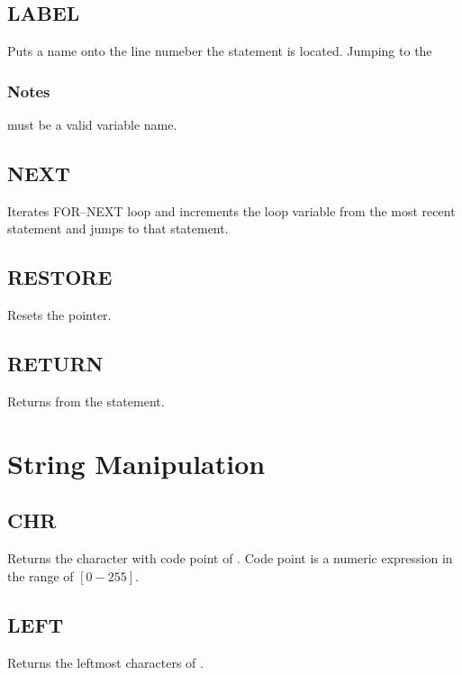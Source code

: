     \subsection{LABEL}
        \par
        Puts a name onto the line numeber the statement is located. Jumping to the 
        \subsubsection*{Notes}
        \begin{itemlist}
        \item {} must be a valid variable name.
        \end{itemlist}
    \subsection{NEXT}
        \par
        Iterates FOR--NEXT loop and increments the loop variable from the most recent  statement and jumps to that statement.
    \subsection{RESTORE}
        \par
        Resets the  pointer.
    \subsection{RETURN}
        \par
        Returns from the  statement.

\section{String Manipulation}

    \subsection{CHR}
        \par
        Returns the character with code point of . Code point is a numeric expression in the range of $[0-255]$.
    \subsection{LEFT}
        \par
        Returns the leftmost  characters of .
